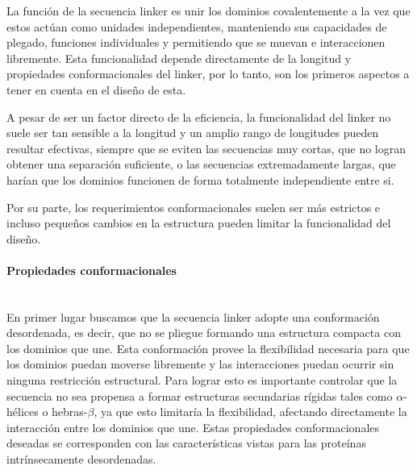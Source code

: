 

La función de la secuencia linker es unir los dominios covalentemente a la vez que estos actúan como unidades independientes, manteniendo sus capacidades de plegado, funciones individuales y 
permitiendo que se muevan e interaccionen libremente. 
Esta funcionalidad depende directamente de la longitud y propiedades conformacionales del linker, por lo tanto, son los primeros aspectos a tener en cuenta en el diseño de esta.

A pesar de ser un factor directo de la eficiencia\cite{robinson1998optimizing}, la funcionalidad del linker no suele ser tan sensible a la longitud y un amplio rango de longitudes pueden resultar efectivas, siempre 
que se eviten las secuencias muy cortas, que no logran obtener una separación suficiente, o las secuencias extremadamente largas, que harían que los dominios funcionen de forma totalmente independiente entre si.

Por su parte, los requerimientos conformacionales suelen ser más estrictos e incluso pequeños cambios en la estructura pueden limitar la funcionalidad del diseño.

\paragraph{Propiedades conformacionales} \hspace{0pt} \\
En primer lugar buscamos que la secuencia linker adopte una conformación desordenada, es decir, que no se pliegue formando una estructura compacta con los dominios que une.
Esta conformación provee la flexibilidad necesaria para que los dominios puedan moverse libremente y las interacciones puedan ocurrir sin ninguna restricción estructural.
Para lograr esto es importante controlar que la secuencia no sea propensa a formar estructuras secundarias rígidas tales como $\alpha$-hélices o hebras-$\beta$, ya que esto
limitaría la flexibilidad, afectando directamente la interacción entre los dominios que une.
Estas propiedades conformacionales deseadas se corresponden con las características vistas para las proteínas intrínsecamente desordenadas. 

